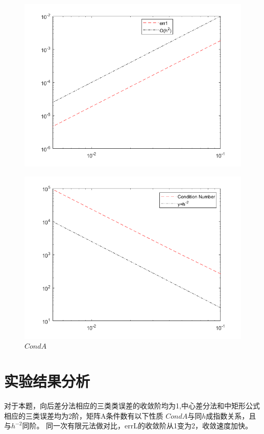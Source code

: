 \documentclass{article}
\begin{document}
\begin{figure}[H]
{\begin{minipage}[t]{0.3\linewidth}
\includegraphics[scale=0.3]{中心差分和有限体积法的中矩形公式/err1.png}
\end{minipage}
}
\end{figure}

\begin{figure}[H]
\centering
\includegraphics[scale=0.5]{中心差分和有限体积法的中矩形公式/CondA.png}
\caption{\label{CondA}$CondA$}
\end{figure}



\section{实验结果分析}
对于本题，向后差分法相应的三类类误差的收敛阶均为1,中心差分法和中矩形公式相应的三类误差均为2阶，矩阵A条件数有以下性质 $CondA$与同$h$成指数关系，且与$h^{-2}$同阶。
同一次有限元法做对比，errL的收敛阶从1变为2，收敛速度加快。
\end{document}
